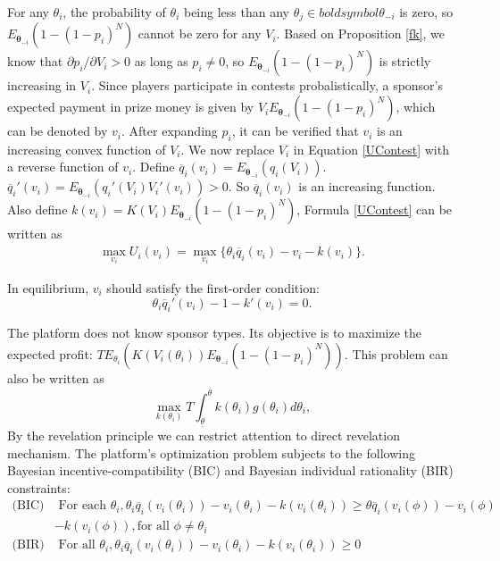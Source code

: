 \documentclass[12pt]{article}
\begin{document}
For any $\theta_{i}$, the probability of $\theta_{i}$
being less than any $\theta_{j}\in boldsymbol{\theta}_{-i}$ is zero, so $E_{\boldsymbol{\theta}_{-i}}(1-(1-p_{i})^{N})$
cannot be zero for any $V_{i}$. Based on Proposition \ref{fk}, we know that $\partial p_{i}/\partial V_{i}>0$
as long as $p_{i}\neq0$, so $E_{\boldsymbol{\theta}_{-i}}(1-(1-p_{i})^{N})$
is strictly increasing in $V_{i}$. Since players participate in contests probalistically, a sponsor's expected payment in prize money is given by $V_{i}E_{\boldsymbol{\theta}_{-i}}(1-(1-p_{i})^{N})$, which can be denoted by $v_{i}$.
After expanding $p_{i}$, it can be verified that $v_{i}$ is an increasing
convex function of $V_{i}$. We now replace $V_{i}$ in Equation \ref{UContest}
with a reverse function of $v_{i}$. Define $\overline{q}_{i}(v_{i})=E_{\boldsymbol{\theta}_{-i}}(q_{i}(V_{i}))$.
$\overline{q}_{i}'(v_{i})=E_{\boldsymbol{\theta}_{-i}}(q_{i}'(V_{i})V_{i}'(v_{i}))>0$.
So $\overline{q}_{i}(v_{i})$ is an increasing function. Also
define $k(v_{i})=K(V_{i})E_{\boldsymbol{\theta}_{-i}}(1-(1-p_{i})^{N})$,
 Formula \ref{UContest} can be written as
\begin{align}
\max_{v_{i}}U_{i}(v_{i})=\max_{v_{i}}\{\theta_{i}\overline{q}_{i}(v_{i})-v_{i}-k(v_{i})\}.
\end{align}


In equilibrium, $v_{i}$ should satisfy the first-order condition:
\begin{equation}
\theta_{i}\overline{q}_{i}'(v_{i})-1-k'(v_{i})=0.\label{prize}
\end{equation}


The platform does not know sponsor types. Its objective is to maximize
the expected profit: $TE_{\theta_{i}}(K(V_{i}(\theta_{i}))E_{\boldsymbol{\theta}_{-i}}(1-(1-p_{i})^{N}))$.
This problem can also be written as
\begin{equation}
\max_{k(\theta_{i})}T\int_{\underline{\theta}}^{\overline{\theta}}k(\theta_{i})g(\theta_{i})d\theta_{i},\label{U_CSR}
\end{equation}
By the revelation principle we can restrict attention to direct revelation mechanism.
The platform's optimization problem subjects to the following Bayesian
incentive-compatibility (BIC) and Bayesian individual rationality
(BIR) constraints:
\begin{align*}
\text{(BIC)} & \text{ For each }\theta_{i},\theta_{i}\overline{q}_{i}(v_{i}(\theta_{i}))-v_{i}(\theta_{i})-k(v_{i}(\theta_{i}))\geq\theta\overline{q}_{i}(v_{i}(\phi))-v_{i}(\phi)\\
 & -k(v_{i}(\phi)),\text{for all }\phi\neq\theta_{i}\\
\text{(BIR)} & \text{ For all }\theta_{i},\theta_{i}\overline{q}_{i}(v_{i}(\theta_{i}))-v_{i}(\theta_{i})-k(v_{i}(\theta_{i}))\geq0
\end{align*}
\end{document}
